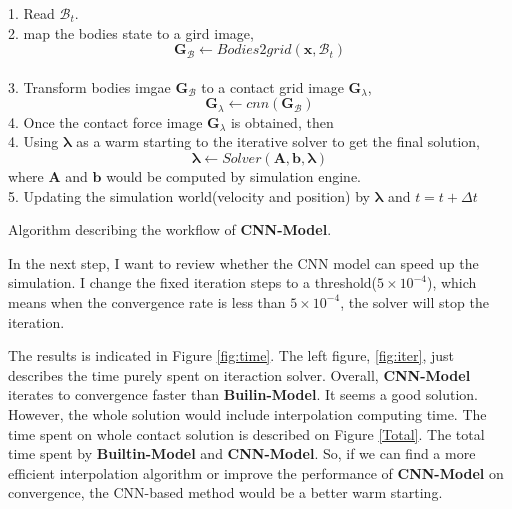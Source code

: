 \begin{algorithm}[!ht]
        {
            1. Read $\mathcal{B}_t$. \\
            2. map the bodies state to a gird image,
                $$\pmb{G}_{\mathcal{B}} \gets Bodies2grid(\mathbf{x}, \mathcal{B}_t)$$ \\
            3. Transform bodies imgae $\pmb{G}_{\mathcal{B}}$ to a contact grid image $\pmb{G}_{\lambda}$,
            $$\pmb{G}_{\lambda} \gets cnn(\pmb{G}_{\mathcal{B}})$$
            4. Once the contact force image $\pmb{G}_{\lambda}$ is obtained,  then \\
            4. Using $\pmb{\lambda}$ as a warm starting to the iterative solver to get the final solution,
            $$\pmb{\lambda} \gets Solver(\pmb{A}, \pmb{b}, \pmb{\lambda})$$
            where $\pmb{A}$ and $\pmb{b}$ would be computed by simulation engine.\\
            5. Updating the simulation world(velocity and position) by $\pmb{\lambda}$ and $t = t+\Delta t$
        }
        \caption{Algorithm describing the workflow of \textbf{CNN-Model}.}
        \label{al:basic}
\end{algorithm}

In the next step, I want to review whether the CNN model can speed up the simulation. I change the fixed iteration steps to a threshold($5\times10^{-4}$), which means when the convergence rate is less than $5\times10^{-4}$, the solver will stop the iteration.

The results is indicated in Figure \ref{fig:time}. The left figure, \ref{fig:iter}, just describes the time purely spent on iteraction solver. Overall, \textbf{CNN-Model} iterates to convergence faster than \textbf{Builin-Model}. It seems a good solution. However, the whole solution would include interpolation computing time. The time spent on whole contact solution is described on Figure \ref{Total}. The total time spent by \textbf{Builtin-Model} and \textbf{CNN-Model}. So, if we can find a more efficient interpolation algorithm or improve the performance of \textbf{CNN-Model} on convergence, the CNN-based method would be a better warm starting.